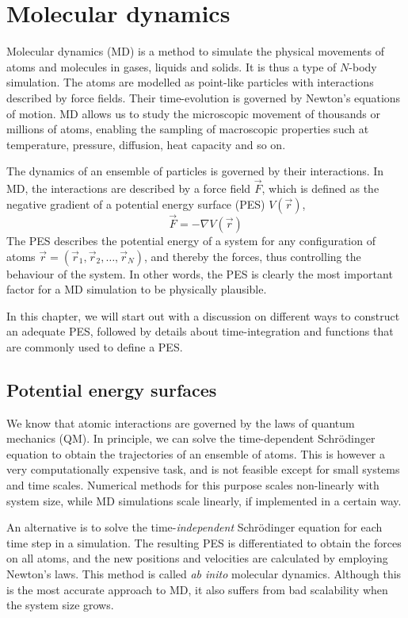 \documentclass[twoside,english]{uiofysmaster}
\begin{document}
\chapter{Molecular dynamics}
Molecular dynamics (MD) is a method to simulate the physical movements of atoms and molecules in gases, liquids and solids. 
It is thus a type of $N$-body simulation. The atoms are modelled as point-like particles with interactions described
by force fields. Their time-evolution is governed by Newton's equations of motion. MD allows us to study the microscopic
movement of thousands or millions of atoms, enabling the sampling of macroscopic properties such at temperature, pressure, 
diffusion, heat capacity and so on. 

The dynamics of an ensemble of particles is governed by their interactions. 
In MD, the interactions are described
by a force field $\vec{F}$, which is defined as the negative gradient of a 
potential energy surface (PES) $V(\vec{r})$,
\begin{equation}
 \vec{F} = -\nabla V(\vec{r})
 \label{forcePES}
\end{equation}
The PES describes the potential energy of a system for any configuration of atoms 
$\vec{r} = (\vec{r}_1, \vec{r}_2, \dots, \vec{r}_N)$, and thereby the forces, thus
controlling the behaviour of the system. In other words, the PES is clearly the most important
factor for a MD simulation to be physically plausible. 

In this chapter, we will start out with a discussion on different ways to construct an adequate PES, followed 
by details about time-integration and functions that are commonly used to define a PES. 

\section{Potential energy surfaces} \label{sec:potentialEnergySurfaces}
We know that atomic interactions are governed by the laws of quantum mechanics (QM). 
In principle, we can solve the time-dependent Schr\"{o}dinger equation to obtain the trajectories of 
an ensemble of atoms. This is however a very computationally expensive task, and is not feasible except for
small systems and time scales. Numerical methods for this purpose scales non-linearly with system size, while
MD simulations scale linearly, if implemented in a certain way. 

An alternative is to solve the time-\textit{independent} Schr\"{o}dinger equation for each time step in a simulation. 
The resulting PES is differentiated to obtain the forces on all atoms, and the new positions and velocities are calculated
by employing Newton's laws. This method is called \textit{ab inito} molecular dynamics. Although this is the most accurate
approach to MD, it also suffers from bad scalability when the system size grows. 
\end{document}
